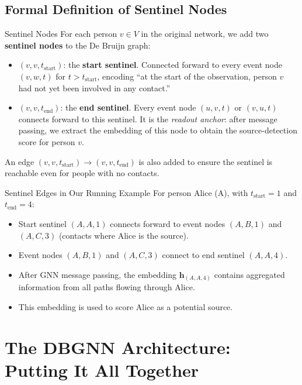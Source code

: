 \subsection{Formal Definition of Sentinel Nodes}

\begin{mathbox}{Sentinel Nodes}
For each person $v \in V$ in the original network, we add two \textbf{sentinel nodes} to the De
Bruijn graph:
\begin{itemize}[noitemsep]
    \item $(v, v, t_{\text{start}})$: the \textbf{start sentinel}. Connected forward to every
          event node $(v, w, t)$ for $t > t_{\text{start}}$, encoding ``at the start of the
          observation, person $v$ had not yet been involved in any contact.''
    \item $(v, v, t_{\text{end}})$: the \textbf{end sentinel}. Every event node $(u, v, t)$
          or $(v, u, t)$ connects forward to this sentinel. It is the \emph{readout anchor}:
          after message passing, we extract the embedding of this node to obtain the
          source-detection score for person $v$.
\end{itemize}
An edge $(v, v, t_{\text{start}}) \to (v, v, t_{\text{end}})$ is also added to ensure the
sentinel is reachable even for people with no contacts.
\end{mathbox}

\begin{examplebox}{Sentinel Edges in Our Running Example}
For person Alice (A), with $t_{\text{start}} = 1$ and $t_{\text{end}} = 4$:
\begin{itemize}[noitemsep]
    \item Start sentinel $(A,A,1)$ connects forward to event nodes $(A,B,1)$ and $(A,C,3)$
          (contacts where Alice is the source).
    \item Event nodes $(A,B,1)$ and $(A,C,3)$ connect to end sentinel $(A,A,4)$.
    \item After GNN message passing, the embedding $\mathbf{h}_{(A,A,4)}$ contains aggregated
          information from all paths flowing through Alice.
    \item This embedding is used to score Alice as a potential source.
\end{itemize}
\end{examplebox}

\section{The DBGNN Architecture: Putting It All Together}

